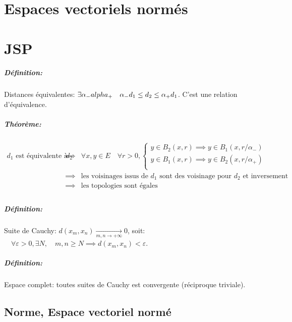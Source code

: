 \documentclass[a4paper, 11pt, french]{book}
\theoremstyle{plain} %
\theoremstyle{definition} %
\theoremstyle{remark} %
\newcommand{\1}{\mathds{1}}
\begin{document}
\chapter{Espaces vectoriels normés}

\chapter{JSP}

\paragraph{Définition:} Distances équivalentes: $\exists\alpha_-\\alpha_+\quad\alpha_- d_1\le d_2\le\alpha_+ d_1 $. C'est une relation d'équivalence.

\paragraph{Théorème:}
$
\begin{array}{rcl}
	\text{$d_1$ est équivalente à $d_2$}
	&\implies &\forall x, y\in E\quad\forall r > 0, 
	\left\{
	\begin{array}{cc}
		y\in B_2(x, r)\implies y\in B_1(x, r/\alpha_-)\\
		y\in B_1(x, r)\implies y\in B_2(x, r/\alpha_+)\\
	\end{array}
	\right.\\
	&\implies &\text{les voisinages issus de $d_1$ sont des voisinage pour $d_2$ et inversement}\\
	&\implies &\text{les topologies sont égales}\\
\end{array}
$

\paragraph{Définition:} Suite de Cauchy: $ d(x_m, x_n)\underset{m, n\rightarrow +\infty}{\rightarrow} 0$, 
soit: $\quad\forall\varepsilon > 0, \exists N, \quad m, n\ge N\implies d(x_m, x_n) <\varepsilon$.

\paragraph{Définition:} Espace complet: toutes suites de Cauchy est convergente (réciproque triviale). 

\section{Norme, Espace vectoriel normé}
\end{document}

